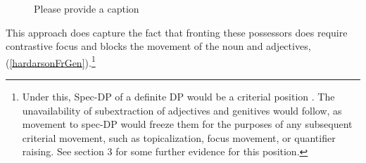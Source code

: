 \documentclass[output=paper,colorlinks,citecolor=brown,
]{langscibook}
\begin{document}
\begin{figure}
\caption{\color{red}Please provide a caption\label{hardarsonfrontposs}}
\end{figure}

This approach does capture the fact that fronting these possessors does require contrastive focus and blocks the movement of the noun and adjectives, (\ref{hardarsonFrGen}).\footnote{Under this, Spec-DP of a definite DP would be a criterial position \citep[cf.][]{Rizzi:2006ti,Boskovic:2008wp,wurmbrand2014gisli,wurmbrand2015}. The unavailability of subextraction of adjectives and genitives would follow, as movement to spec-DP would freeze them for the purposes of any subsequent criterial movement, such as topicalization, focus movement, or quantifier raising. See section 3 for some further evidence for this position.}

\begin{exe}
\ex	\label{hardarsonFrGen}
	\begin{xlist}
	\setlength{\columnsep}{20pt}
	\begin{multicols}{2}
	\end{multicols}
	\end{xlist}
\end{exe}
\end{document}
